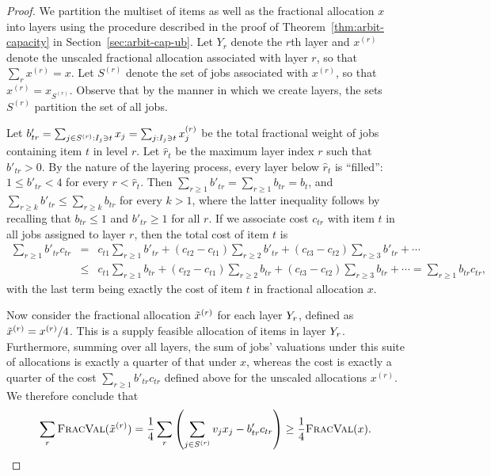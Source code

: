 \begin{proof}
  We partition the multiset of items as well as the fractional
  allocation $x$ into layers using the procedure described in the
  proof of Theorem~\ref{thm:arbit-capacity} in
  Section~\ref{sec:arbit-cap-ub}. Let $Y_r$ denote the $r$th layer and
  $x^{(r)}$ denote the unscaled fractional allocation associated with
  layer $r$, so that $\sum_r x^{(r)} = x$. Let $S^{(r)}$ denote the
  set of jobs associated with $x^{(r)}$, so that
  $x^{(r)} = x_{S^{(r)}}$. Observe that by the manner in which we
  create layers, the sets $S^{(r)}$ partition the set of all jobs.

  Let
  $b'_{tr} = \sum_{j\in S^{(r)}: {I_{j}} \ni t}x_j = \sum_{j: {I_{j}} \ni
    t} x^{(r)}_j$ be the total fractional weight of jobs containing
  item $t$ in level $r$. Let $\hat{r}_t$ be the maximum layer index
  $r$ such that $b'_{tr}>0$. By the nature of the layering process,
  every layer below $\hat{r}_t$ is ``filled'': $1 \le b'_{tr} < 4$ for
  every $r < \hat{r}_t$. Then
  $\sum_{r\geq 1}b'_{tr}=\sum_{r\geq 1}b_{tr}=b_t$, and
  $\sum_{r\geq k}b'_{tr}\le \sum_{r\geq k}b_{tr}$ for every $k>1$,
  where the latter inequality follows by recalling that $b_{tr}\le 1$
  and $b'_{tr}\ge 1$ for all $r$. If we associate cost $c_{tr}$ with
  item $t$ in all jobs assigned to layer $r$, then the total cost of
  item $t$ is
\begin{eqnarray*}
\sum_{r\geq 1}b'_{tr}c_{tr}&=&c_{t1}\sum_{r\geq 1}b'_{tr}+(c_{t2}-c_{t1})\sum_{r\geq 2}b'_{tr}+(c_{t3}-c_{t2})\sum_{r\geq 3}b'_{tr}+\cdots\\
&\leq&c_{t1}\sum_{r\geq 1}b_{tr}+(c_{t2}-c_{t1})\sum_{r\geq 2}b_{tr}+(c_{t3}-c_{t2})\sum_{r\geq 3}b_{tr}+\cdots=\sum_{r\geq 1}b_{tr}c_{tr},
\end{eqnarray*} 
    with the last term being exactly the cost of item $t$ in
    fractional allocation $x$. 

    Now consider the fractional allocation ${\tilde{x}^{(r)}}$ for each layer
    $Y_{r}$, defined as ${\tilde{x}^{(r)}}=x^{(r)}/4$. This is a supply feasible
    allocation of items in layer $Y_{r}$. Furthermore, summing over
    all layers, the sum of jobs' valuations under this suite of
    allocations is exactly a quarter of that under $x$, whereas the
    cost is exactly a quarter of the cost
    $\sum_{r\geq 1}b'_{tr}c_{tr}$ defined above for the unscaled
    allocations $x^{(r)}$. We therefore conclude that
    \[\sum_r {\normalfont\textsc{FracVal}}({\tilde{x}^{(r)}}) = \frac 14\sum_r \left(\sum_{j\in S^{(r)}} v_jx_j - b'_{tr}c_{tr}\right) \ge \frac{1}{4} {\normalfont\textsc{FracVal}}(x).\]


\end{proof}

